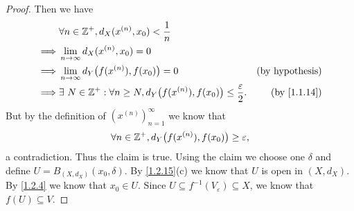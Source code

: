 \begin{proof}
  Then we have
  \begin{align*}
             & \forall n \in \Z^+, d_X(x^{(n)}, x_0) < \frac{1}{n}                                                                             \\
    \implies & \lim_{n \to \infty} d_X(x^{(n)}, x_0) = 0                                                                                       \\
    \implies & \lim_{n \to \infty} d_Y\big(f(x^{(n)}), f(x_0)\big) = 0                                             & \text{(by hypothesis)}    \\
    \implies & \exists\ N \in \Z^+ : \forall n \geq N, d_Y\big(f(x^{(n)}), f(x_0)\big) \leq \frac{\varepsilon}{2}. & \text{(by \cref{1.1.14})}
  \end{align*}
  But by the definition of \((x^{(n)})_{n = 1}^\infty\) we know that
  \[
    \forall n \in \mathbb{Z}^+, d_Y\big(f(x^{(n)}), f(x_0)\big) \geq \varepsilon,
  \]
  a contradiction.
  Thus the claim is true.
  Using the claim we choose one \(\delta\) and define \(U = B_{(X, d_X)}(x_0, \delta)\).
  By \cref{1.2.15}(c) we know that \(U\) is open in \((X, d_X)\).
  By \cref{1.2.4} we know that \(x_0 \in U\).
  Since \(U \subseteq f^{-1}(V_\varepsilon) \subseteq X\), we know that \(f(U) \subseteq V\).


\end{proof}
